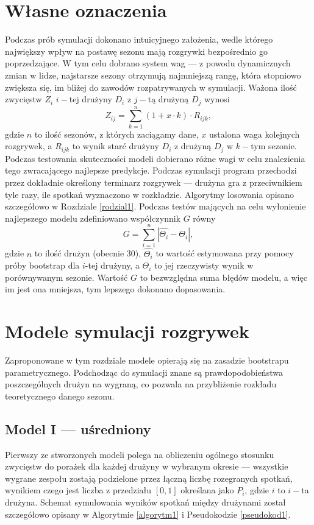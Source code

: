 \documentclass[inzynierska]{pwr_wmat_praca_dyplomowa}
\theoremstyle{plain}
\numberwithin{theorem}{chapter}
\theoremstyle{definition}
\numberwithin{theorem}{chapter}
\begin{document}
\section{Własne oznaczenia} \label{wlasne_oznaczenia}
Podczas prób symulacji dokonano intuicyjnego założenia, wedle którego największy wpływ na postawę sezonu mają rozgrywki bezpośrednio go poprzedzające. W tym celu dobrano system wag --- z powodu dynamicznych zmian w lidze, najstarsze sezony otrzymują najmniejszą rangę, która stopniowo zwiększa się, im bliżej do zawodów rozpatrywanych w symulacji. Ważona ilość zwycięstw $Z_i$ $i-$tej drużyny $D_i$ z $j-$tą drużyną $D_j$ wynosi
\begin{equation}
	Z_{ij} = \sum_{k=1}^{n} (1+x\cdot k)\cdot R_{ijk}, 
\end{equation}
gdzie $n$ to ilość sezonów, z których zaciągamy dane, $x$ ustalona waga kolejnych rozgrywek, a $R_{ijk}$ to wynik starć drużyny $D_i$ z drużyną $D_j$ w $k-$tym sezonie. Podczas testowania skuteczności modeli dobierano różne wagi w celu znalezienia tego zwracającego najlepsze predykcje. Podczas symulacji program przechodzi przez dokładnie określony terminarz rozgrywek --- drużyna gra z przeciwnikiem tyle razy, ile spotkań wyznaczono w rozkładzie. Algorytmy losowania opisano szczegółowo w Rozdziale \ref{rodzial1}. 
Podczas testów mających na celu wyłonienie najlepszego modelu zdefiniowano współczynnik $G$ równy
\begin{equation}\label{wskaznik_g}
	G = \sum_{i=1}^{n}|\hat{\Theta_i} - \Theta_i|,
\end{equation}
gdzie $n$ to ilość drużyn (obecnie 30), $\hat{\Theta_i}$ to wartość estymowana przy pomocy próby bootstrap dla $i$-tej drużyny, a $\Theta_i$ to jej rzeczywisty wynik w porównywanym sezonie. Wartość $G$ to bezwzględna suma błędów modelu, a więc im jest ona mniejsza, tym lepszego dokonano dopasowania. 

\section{Modele symulacji rozgrywek}
Zaproponowane w tym rozdziale modele opierają się na zasadzie bootstrapu parametrycznego. Podchodząc do symulacji znane są prawdopodobieństwa poszczególnych drużyn na wygraną, co pozwala na przybliżenie rozkładu teoretycznego danego sezonu. 

\subsection{Model I --- uśredniony}
Pierwszy ze stworzonych modeli polega na obliczeniu ogólnego stosunku zwycięstw do porażek dla każdej drużyny w wybranym okresie --- wszystkie wygrane zespołu zostają podzielone przez łączną liczbę rozegranych spotkań, wynikiem czego jest liczba z przedziału $[0,1]$ określana jako $P_{i}$, gdzie $i$ to $i-$ta drużyna. Schemat symulowania wyników spotkań między drużynami został szczegółowo opisany w Algorytmie \ref{algorytm1} i Pseudokodzie \ref{pseudokod1}.
\end{document}
